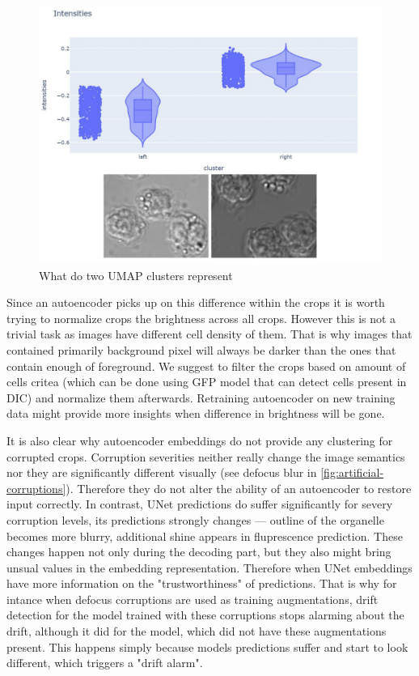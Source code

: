 \begin{figure}[H]
	\begin{center}
		\includegraphics[width=0.5\linewidth]{bilder/ae-embeddings/brighter-darker.png}
		\caption{What do two UMAP clusters represent}
		\label{fig:ae-brighter-darker}
	\end{center}
\end{figure}

Since an autoencoder picks up on this difference within the crops it is worth trying to normalize crops the brightness across all crops. However this is not a trivial task as images have different cell density of them. That is why images that contained primarily background pixel will always be darker than the ones that contain enough of foreground. We suggest to filter the crops based on amount of cells critea (which can be done using GFP model that can detect cells present in DIC) and normalize them afterwards. Retraining autoencoder on new training data might provide more insights when difference in brightness will be gone.

It is also clear why autoencoder embeddings do not provide any clustering for corrupted crops. Corruption severities neither really change the image semantics nor they are significantly different visually (see defocus blur in \ref{fig:artificial-corruptions}). Therefore they do not alter the ability of an autoencoder to restore input correctly. In contrast, UNet predictions do suffer significantly for severy corruption levels, its predictions strongly changes --- outline of the organelle becomes more blurry, additional shine appears in fluprescence prediction. These changes happen not only during the decoding part, but they also might bring unsual values in the embedding representation. Therefore when UNet embeddings have more information on the "trustworthiness" of predictions. That is why for intance when defocus corruptions are used as training augmentations, drift detection for the model trained with these corruptions stops alarming about the drift, although it did for the model, which did not have these augmentations present. This happens simply because models predictions suffer and start to look different, which triggers a "drift alarm".